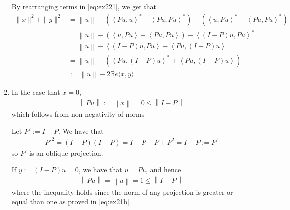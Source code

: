 \documentclass{article}
\providecommand{\lin}[1]{\ensuremath{\left\langle #1 \right\rangle}}
\providecommand{\norm}[1]{\ensuremath{\left\lVert#1\right\rVert}}
\begin{document}
\begin{enumerate}[label=(\roman*)]
    By rearranging terms in \eqref{eq:ex221}, we get that
    \begin{align}
        \|x\|^2 + \|y\|^2 &= \norm{u}  - (\lin{Pu, u}^* - \lin{Pu, Pu}^*) - (\lin{u, Pu}^* - \lin{Pu, Pu}^*) \\
        &= \norm{u} - (\lin{u, Pu} - \lin{Pu, Pu}) - \lin{(I-P)u, Pu}^* \\
         &= \norm{u} - \lin{(I-P)u, Pu} - \lin{Pu, (I-P)u} \\
        &= \norm{u} - (\lin{Pu, (I-P)u}^* + \lin{Pu, (I-P)u})\\
        &:= \norm{u} - 2 \mathbb{R}e\langle x, y \rangle
        \label{eq:ex22}
    \end{align}
    \item
    In the case that $x=0$,
    \begin{align}
        \norm{Pu}:=\norm{x} = 0 \leq \norm{I - P}
    \end{align}
    which follows from non-negativity of norms.
    
    Let $P':=I-P$. We have that
    \begin{align}
        P'^2 = (I-P)(I-P)=I-P-P+P^2 = I-P := P'
        \label{eq:projection}
    \end{align}
    so $P'$ is an oblique projection.
    
    If $y:=(I-P)u=0$, we have that $u = Pu$, and hence
    \begin{align}
        \norm{Pu} = \norm{u} = 1 \leq \norm{I-P}
    \end{align}
    where the inequality holds since the norm of any projection is greater or equal than one as proved in \eqref{eq:ex21b}.
    

\end{enumerate}
\end{document}
